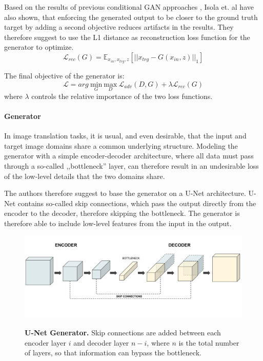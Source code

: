 \documentclass[12pt]{report}
\begin{document}
\pagebreak
Based on the results of previous conditional GAN approaches \cite{pathak_context_2016}, Isola et. al \cite{isola_image--image_2016} have also shown, that enforcing the generated output to be closer to the ground truth target by adding a second objective reduces artifacts in the results. They therefore suggest to use the L1 distance as reconstruction loss function for the generator to optimize.
\begin{equation}
\mathcal{L}_{rec}(G) = \mathbb{E}_{x_{in},x_{trg},z}[||x_{trg}-G(x_{in},z)||_{1}]
\label{eq:pix2pix_loss_rec}
\end{equation}

The final objective of the generator is:
\begin{equation}
\mathcal{L} = arg \ \underset{G}{\mathrm{min}} \ \underset{D}{\mathrm{max}} \ \mathcal{L}_{adv}(D,G) + \lambda \mathcal{L}_{rec}(G)
\end{equation}
where $\lambda$ controls the relative importance of the two loss functions.


\paragraph{Generator}
In image translation tasks, it is usual, and even desirable, that the input and target image domains share a common underlying structure. Modeling the generator with a simple encoder-decoder architecture, where all data must pass through a so-called ,,bottleneck'' layer, can therefore result in an undesirable loss of the low-level details that the two domains share. 

The authors therefore suggest to base the generator on a U-Net architecture. U-Net contains so-called skip connections, which pass the output directly from the encoder to the decoder, therefore skipping the bottleneck. The generator is therefore able to include low-level features from the input in the output.

\begin{figure}[h]
\centering
{\includegraphics[width=\linewidth]{03_analysis/gans/u-net}}
\caption{\label{fig:u-net} \textbf{U-Net Generator.} Skip connections are added between each encoder layer $i$ and decoder layer $n - i$, where $n$ is the total number of layers, so that information can bypass the bottleneck.}
\end{figure}
\end{document}
